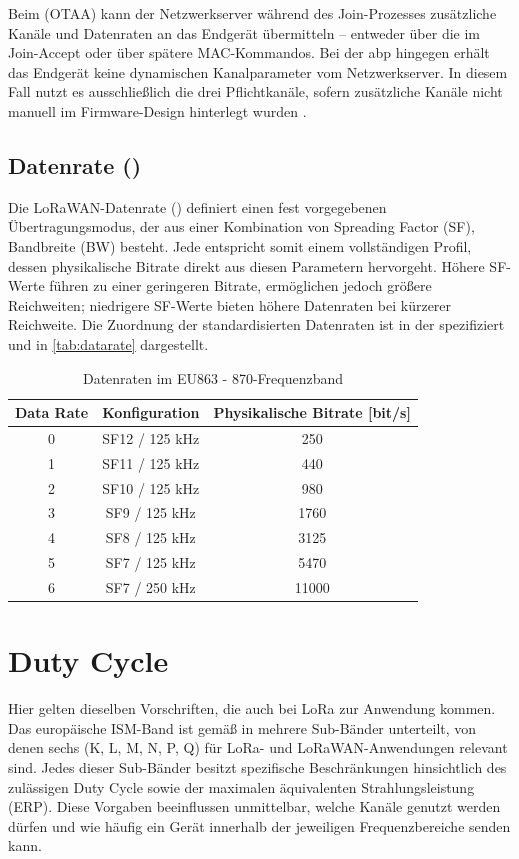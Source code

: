 	Beim  (OTAA) kann der Netzwerkserver während des Join-Prozesses zusätzliche Kanäle und Datenraten an das Endgerät übermitteln – entweder über die  im Join-Accept oder über spätere MAC-Kommandos. Bei der \ac{abp} hingegen erhält das Endgerät keine dynamischen Kanalparameter vom Netzwerkserver. In diesem Fall nutzt es ausschlie{\ss}lich die drei Pflichtkanäle, sofern zusätzliche Kanäle nicht manuell im Firmware-Design hinterlegt wurden \cite{LoRaAlliance:2022, Montagny:2022}.


\subsection{Datenrate () \label{lorawan:dataRate}}
	Die LoRaWAN-Datenrate () definiert einen fest vorgegebenen Übertragungsmodus, der aus einer Kombination von Spreading Factor (SF), Bandbreite (BW) besteht. Jede  entspricht somit einem vollständigen Profil, dessen physikalische Bitrate direkt aus diesen Parametern hervorgeht. Höhere SF-Werte führen zu einer geringeren Bitrate, ermöglichen jedoch grö{\ss}ere Reichweiten; niedrigere SF-Werte bieten höhere Datenraten bei kürzerer Reichweite. Die Zuordnung der standardisierten Datenraten ist in der \textcite{LoRaAlliance:2022} spezifiziert und in \autoref{tab:datarate} dargestellt.

	\begin{table}[H]
		\centering
		\begin{tabular}{|c|c|c|}
			\hline
			\textbf{Data Rate} & \textbf{Konfiguration} & \textbf{Physikalische Bitrate [bit/s]}\\
			\hline
			0 &SF12 / 125 kHz & 250 \\
			\hline
			1 & SF11 / 125 kHz & 440 \\
			\hline
			2 & SF10 / 125 kHz & 980 \\
			\hline
			3 & SF9 / 125 kHz & 1760 \\
			\hline
			4 & SF8 / 125 kHz & 3125 \\
			\hline
			5 & SF7 / 125 kHz & 5470 \\
			\hline
			6 & SF7 / 250 kHz & 11000 \\
			\hline
		\end{tabular}
		\caption{Datenraten im EU863 - 870-Frequenzband}
		\label{tab:datarate}
	\end{table}


\section{Duty Cycle}
	Hier gelten dieselben Vorschriften, die auch bei LoRa zur Anwendung kommen. Das europäische ISM-Band ist gemä{\ss} \citeauthor[22]{ETSI:2018b} in mehrere Sub-Bänder unterteilt, von denen sechs (K, L, M, N, P, Q) für LoRa- und LoRaWAN-Anwendungen relevant sind. Jedes dieser Sub-Bänder besitzt spezifische Beschränkungen hinsichtlich des zulässigen Duty Cycle sowie der maximalen äquivalenten Strahlungsleistung (ERP). Diese Vorgaben beeinflussen unmittelbar, welche Kanäle genutzt werden dürfen und wie häufig ein Gerät innerhalb der jeweiligen Frequenzbereiche senden kann.
	
